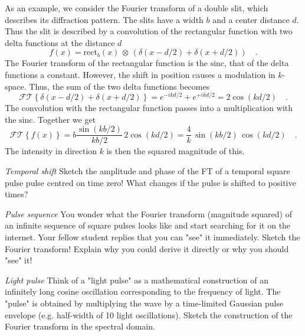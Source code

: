 As an example, we consider the Fourier transform of a double slit, which describes its diffraction pattern. The slits have a width $b$ and a center distance $d$. Thus the slit is described by a convolution of the rectangular function with two delta functions at the distance $d$
\begin{equation}
f(x) = \text{rect} _b (x) \, \otimes \, \left( \delta (x - d/2) + \delta (x + d/2) \right) \quad .
\end{equation}
The Fourier transform of the rectangular function is the $\text{sinc}$, that of the delta functions a constant. However, the shift in position causes a modulation in $k$-space. Thus, the sum of the two delta functions becomes 
\begin{equation}
\mathcal{FT}\left\{ \delta (x - d/2) + \delta (x + d/2) \right\} =
e^{-i k d/2} + e^{+i k d/2} = 2 \cos ( k d/2) \quad .
\end{equation}
The convolution with the rectangular function passes into a multiplication with the $\text{sinc}$. Together we get
\begin{equation}
\mathcal{FT}\left\{ f(x) \right\} = b \frac{\sin (k b/2) }{kb/2} \, 2 \cos ( k d/2) = \frac{4}{k} \, \sin (k b/2) \, \cos ( k d/2)  \quad .
\end{equation}
The intensity in direction $k$ is then the squared magnitude  of this.




\begin{questions}
  \item \emph{Temporal shift}
    Sketch the amplitude and phase of the FT of a temporal square  pulse pulse centred on time zero!    What changes if the pulse is shifted to positive times?

    \item \emph{Pulse sequence} You wonder what the Fourier transform (magnitude squared) of an infinite sequence of square pulses looks like and start searching for it on the internet. Your fellow student replies that you can "see" it immediately.
    Sketch the Fourier transform!
    Explain why you could derive it directly or why you should "see" it!

    \item \emph{Light pulse}
    Think of a "light pulse" as a mathematical construction of an infinitely long cosine oscillation corresponding to the frequency of light. The "pulse" is obtained by multiplying the wave by a time-limited Gaussian pulse envelope (e.g. half-width of 10 light oscillations).
    Sketch the construction of the Fourier transform in the spectral domain.
\end{questions}




